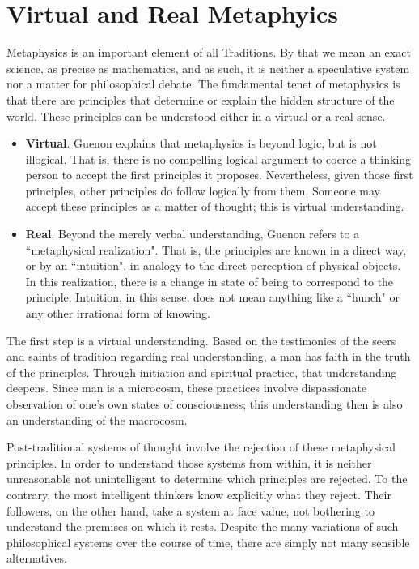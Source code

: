 \section{Virtual and Real Metaphyics}

Metaphysics is an important element of all Traditions. By that we mean an exact science, as precise as mathematics, and as such, it is neither a speculative system nor a matter for philosophical debate. The fundamental tenet of metaphysics is that there are principles that determine or explain the hidden structure of the world. These principles can be understood either in a virtual or a real sense.

\begin{itemize}
\item \textbf{Virtual}. Guenon explains that metaphysics is beyond logic, but is not illogical. That is, there is no compelling logical argument to coerce a thinking person to accept the first principles it proposes. Nevertheless, given those first principles, other principles do follow logically from them. Someone may accept these principles as a matter of thought; this is virtual understanding. 
\item \textbf{Real}. Beyond the merely verbal understanding, Guenon refers to a ``metaphysical realization". That is, the principles are known in a direct way, or by an ``intuition", in analogy to the direct perception of physical objects. In this realization, there is a change in state of being to correspond to the principle. Intuition, in this sense, does not mean anything like a ``hunch" or any other irrational form of knowing. 
\end{itemize}
The first step is a virtual understanding. Based on the testimonies of the seers and saints of tradition regarding real understanding, a man has faith in the truth of the principles. Through initiation and spiritual practice, that understanding deepens. Since man is a microcosm, these practices involve dispassionate observation of one's own states of consciousness; this understanding then is also an understanding of the macrocosm.

Post-traditional systems of thought involve the rejection of these metaphysical principles. In order to understand those systems from within, it is neither unreasonable not unintelligent to determine which principles are rejected. To the contrary, the most intelligent thinkers know explicitly what they reject. Their followers, on the other hand, take a system at face value, not bothering to understand the premises on which it rests. Despite the many variations of such philosophical systems over the course of time, there are simply not many sensible alternatives.


